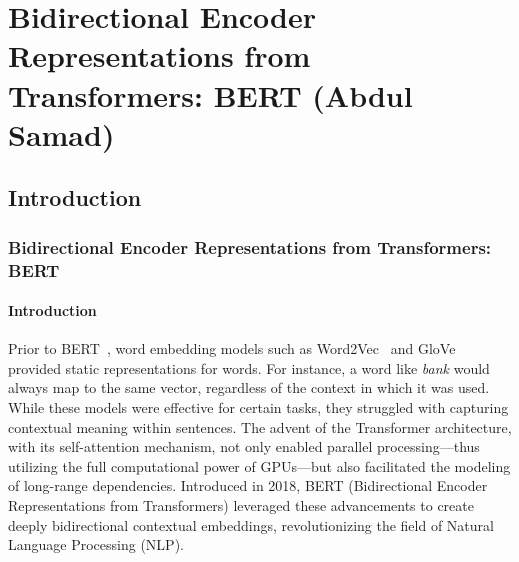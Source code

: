 
\chapter{Bidirectional Encoder Representations from Transformers: BERT (Abdul Samad)}
\label{Chapter2}

\section{Introduction}
\subsection{Bidirectional Encoder Representations from Transformers: BERT}
\subsubsection{Introduction}
Prior to BERT~\cite{devlin2018bert}, word embedding models such as Word2Vec~\cite{mikolov2013efficient} and GloVe~\cite{pennington2014glove} provided static representations for words. For instance, a word like \textit{bank} would always map to the same vector, regardless of the context in which it was used. While these models were effective for certain tasks, they struggled with capturing contextual meaning within sentences.
The advent of the Transformer architecture, with its self-attention mechanism, not only enabled parallel processing—thus utilizing the full computational power of GPUs—but also facilitated the modeling of long-range dependencies. Introduced in 2018, BERT (Bidirectional Encoder Representations from Transformers) leveraged these advancements to create deeply bidirectional contextual embeddings, revolutionizing the field of Natural Language Processing (NLP).

